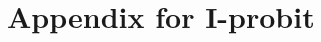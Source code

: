\documentclass[a4paper,11pt,showframe]{report}
\begin{document}
\hPrintBibliography

\appendix

\chapter{Appendix for I-probit}

\printindex
\end{document}

